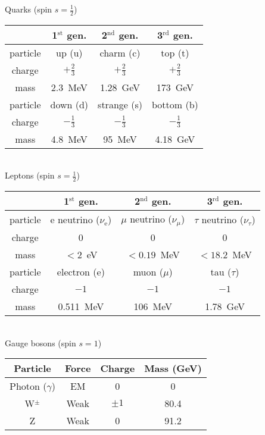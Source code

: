 
\begin{table}[t]
\centering
Quarks (spin $s=\frac{1}{2}$) \\
\begin{tabular}{c|c|c|c}
\hline
& 1$^{\mathrm{st}}$ gen. & 2$^{\mathrm{nd}}$ gen. & 3$^{\mathrm{rd}}$ gen. \\ 
\hline
particle & up (u) & charm (c) & top (t) \\
charge & $+\frac{2}{3}$ & $+\frac{2}{3}$ & $+\frac{2}{3}$ \\
mass & 2.3~MeV & 1.28~GeV & 173~GeV \\
\hline
particle & down (d) & strange (s) & bottom (b) \\
charge & $-\frac{1}{3}$ & $-\frac{1}{3}$ & $-\frac{1}{3}$ \\
mass & 4.8~MeV & 95~MeV & 4.18~GeV \\
\hline
\end{tabular} \\ \vspace{0.5cm}
Leptons (spin $s=\frac{1}{2}$) \\
\begin{tabular}{c|c|c|c}
\hline
& 1$^{\mathrm{st}}$ gen. & 2$^{\mathrm{nd}}$ gen. & 3$^{\mathrm{rd}}$ gen. \\ 
\hline
particle & e neutrino ($\nu_{\mathrm{e}}$) & $\mu$ neutrino ($\nu_\mu$) & 
$\tau$ neutrino ($\nu_\tau$) \\
charge & 0 & 0 & 0 \\
mass & $<2$~eV & $<0.19$~MeV & $<18.2$~MeV \\
\hline
particle & electron (e) & muon ($\mu$) & tau ($\tau$) \\
charge & $-1$ & $-1$ & $-1$ \\
mass & 0.511~MeV & 106~MeV & 1.78~GeV \\
\hline
\end{tabular} \\ \vspace{0.5cm}
Gauge bosons (spin $s=1$) \\
\begin{tabular}{cccc}
\hline
Particle & Force & Charge & Mass (GeV) \\ \hline
Photon ($\gamma$) & EM & 0 & 0 \\
W$^{\pm}$ & Weak & $\pm1$ & 80.4 \\
Z & Weak & 0 & 91.2 \\

\end{tabular}
\end{table}
